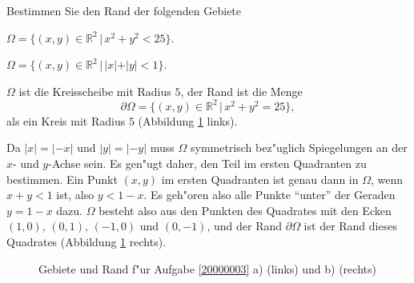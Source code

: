 Bestimmen Sie den Rand der folgenden Gebiete
\begin{teilaufgaben}
\item
$\Omega=\{(x,y)\in\mathbb R^2\,|\, x^2+y^2<25\}$.
\item
$\Omega=\{(x,y)\in\mathbb R^2\,|\, |x|+|y|<1\}$.
\end{teilaufgaben}

\begin{loesung}
\begin{teilaufgaben}
\item
$\Omega$ ist die Kreisscheibe mit Radius $5$, der Rand ist die Menge
\[
\partial\Omega=\{(x,y)\in\mathbb R^2\,|\, x^2+y^2=25\},
\]
als ein Kreis mit Radius $5$ (Abbildung \ref{20000003:fig} links).
\item
Da $|x|=|-x|$ und $|y|=|-y|$ muss $\Omega$ symmetrisch bez"uglich
Spiegelungen an der $x$- und $y$-Achse sein. Es gen"ugt daher,
den Teil im ersten Quadranten zu bestimmen.  Ein Punkt $(x,y)$
im ersten Quadranten ist genau dann in $\Omega$, wenn $x+y<1$ ist,
also $y<1-x$. Es geh"oren also alle Punkte ``unter'' der Geraden
$y=1-x$ dazu. $\Omega$ besteht also aus den Punkten des
Quadrates mit den Ecken $(1,0)$, $(0,1)$, $(-1,0)$ und $(0,-1)$,
und der Rand $\partial\Omega$ ist der Rand dieses Quadrates
(Abbildung \ref{20000003:fig} rechts).
\end{teilaufgaben}
\begin{figure}
\begin{center}
\qquad
{}
\end{center}
\caption{Gebiete und Rand f"ur Aufgabe \ref{20000003} a) (links)
und b) (rechts)\label{20000003:fig}}
\end{figure}
\end{loesung}
